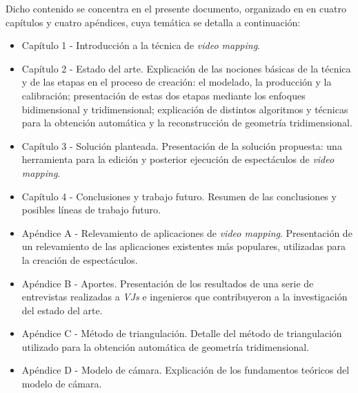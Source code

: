 Dicho contenido se concentra en el presente documento, organizado en en cuatro capítulos y cuatro apéndices, cuya temática se detalla a continuación:
\begin{itemize}
\item Capítulo 1 - Introducción a la técnica de \emph{video mapping}.
\item Capítulo 2 - Estado del arte. Explicación de las nociones básicas de la técnica y de las etapas en el proceso de creación: el modelado, la producción y la calibración; presentación de estas dos etapas mediante los enfoques bidimensional y tridimensional; explicación de distintos algoritmos y técnicas para la obtención automática y la reconstrucción de geometría tridimensional.
\item Capítulo 3 - Solución planteada. Presentación de la solución propuesta: una herramienta para la edición y posterior ejecución de espectáculos de \emph{video mapping}.
\item Capítulo 4 - Conclusiones y trabajo futuro. Resumen de las conclusiones y posibles líneas de trabajo futuro.
\item Apéndice A - Relevamiento de aplicaciones de \emph{video mapping}. Presentación de un relevamiento de las aplicaciones existentes más populares, utilizadas para la creación de espectáculos.
\item Apéndice B - Aportes. Presentación de los resultados de una serie de entrevistas realizadas a  \emph{VJs} e ingenieros que contribuyeron a la investigación del estado del arte.
\item Apéndice C - Método de triangulación. Detalle del método de triangulación utilizado para la obtención automática de geometría tridimensional.
\item Apéndice D - Modelo de cámara. Explicación de los fundamentos teóricos del modelo de cámara.
\end{itemize}